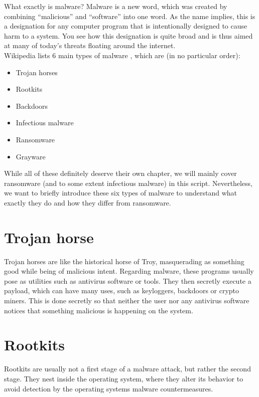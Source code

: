 What exactly is malware?
Malware is a new word, which was created by combining \enquote{malicious} and \enquote{software} into one word.
As the name implies, this is a designation for any computer program that is intentionally designed to cause harm to a system.
You see how this designation is quite broad and is thus aimed at many of today's threats floating around the internet.
\\

Wikipedia lists 6 main types of malware%
, which are (in no particular order):

\begin{itemize}
    \item Trojan horses
    \item Rootkits
    \item Backdoors
    \item Infectious malware
    \item Ransomware
    \item Grayware
\end{itemize}

While all of these definitely deserve their own chapter, we will mainly cover ransomware (and to some extent infectious malware) in this script.
Nevertheless, we want to briefly introduce these six types of malware to understand what exactly they do and how they differ from ransomware.

\section{Trojan horse}

Trojan horses are like the historical horse of Troy, masquerading as something good while being of malicious intent.
Regarding malware, these programs usually pose as utilities such as antivirus software or tools.
They then secretly execute a payload, which can have many uses, such as keyloggers, backdoors or crypto miners.
This is done secretly so that neither the user nor any antivirus software notices that something malicious is happening on the system.

\section{Rootkits}

Rootkits are usually not a first stage of a malware attack, but rather the second stage.
They nest inside the operating system, where they alter its behavior to avoid detection by the operating systems malware countermeasures.

